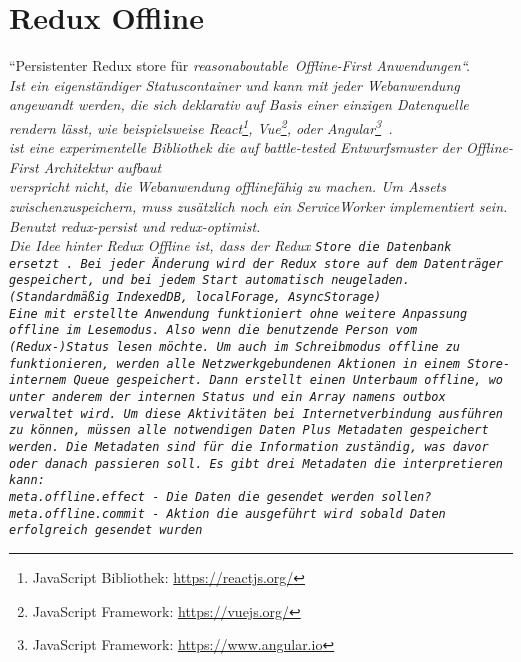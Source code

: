 \section{\label{sub:reduxoffline}Redux Offline}
``Persistenter Redux store für \it{reasonaboutable}\texttrademark ~Offline-First Anwendungen``. \\
Ist ein eigenständiger Statuscontainer und kann mit jeder Webanwendung angewandt werden, die sich \it{deklarativ auf Basis einer einzigen Datenquelle rendern lässt}, wie beispielsweise React\footnote{JavaScript Bibliothek: \url{https://reactjs.org/}}, Vue\footnote{JavaScript Framework: \url{https://vuejs.org/}}, oder Angular\footnote{JavaScript Framework: \url{https://www.angular.io}}~\cite{redux-offline-compabilaty}.\\
ist eine experimentelle Bibliothek die auf \it{battle-tested} Entwurfsmuster der Offline-First Architektur aufbaut\\
 verspricht nicht, die Webanwendung offlinefähig zu machen. Um \gls{Assets} zwischenzuspeichern, muss zusätzlich noch ein ServiceWorker implementiert sein.\\
Benutzt redux-persist und redux-optimist.\\
Die Idee hinter Redux Offline ist, dass der Redux \tt{Store} die Datenbank ersetzt~\cite{redux-offline}.
Bei jeder Änderung wird der Redux store auf dem Datenträger gespeichert, und bei jedem Start automatisch neugeladen. (Standardmäßig IndexedDB, localForage, AsyncStorage)\\
Eine mit  erstellte Anwendung funktioniert ohne weitere Anpassung offline im Lesemodus. Also wenn die benutzende Person vom (Redux-)Status lesen möchte.
Um auch im Schreibmodus offline zu funktionieren, werden alle Netzwerkgebundenen Aktionen in einem Store-internem \gls{Queue} gespeichert. Dann erstellt  einen Unterbaum \tt{offline}, wo unter anderem der internen Status und ein Array namens \tt{outbox} verwaltet wird. Um diese Aktivitäten bei Internetverbindung ausführen zu können, müssen alle notwendigen Daten Plus Metadaten gespeichert werden. Die Metadaten sind für die Information zuständig, was davor oder danach passieren soll. Es gibt drei Metadaten die  interpretieren kann:\\
\tt{meta.offline.effect} - Die Daten die gesendet werden sollen?\\
\tt{meta.offline.commit} - Aktion die ausgeführt wird sobald Daten erfolgreich gesendet wurden\\
